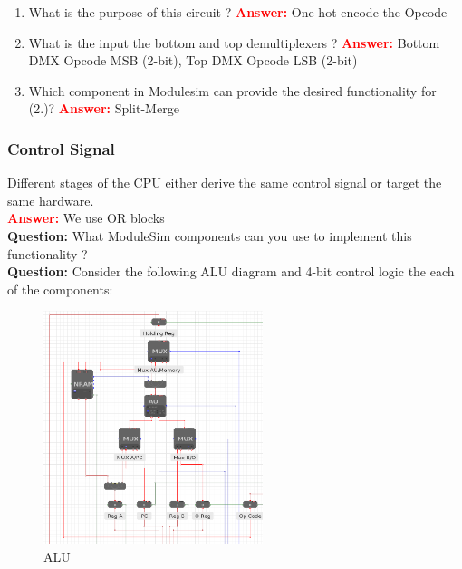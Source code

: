\documentclass[a4paper, 11pt]{article}
\begin{document}
\begin{enumerate}
    \item What is the purpose of this circuit ?
    \textcolor{red}{\textbf{Answer:}} One-hot encode the Opcode\\
    \item What is the input the bottom and top demultiplexers ?
    \textcolor{red}{\textbf{Answer:}} Bottom DMX Opcode MSB (2-bit), Top DMX Opcode LSB (2-bit)\\
    \item Which component in Modulesim can provide the desired functionality for (2.)?
       \textcolor{red}{\textbf{Answer:}} Split-Merge\\
\end{enumerate}
\subsubsection{Control Signal}
Different stages of the CPU either derive the same control signal or target the same hardware. \\
\textcolor{red}{\textbf{Answer:}} We use OR blocks\\
\textbf{Question:} What ModuleSim components can you use to implement this functionality ? \\
\textbf{Question:} Consider the following ALU diagram and 4-bit control logic the each of the components:
\begin{figure}[H]
    \centering
    \includegraphics[width =0.57\textwidth]{Images/Screenshot from 2022-12-14 16-40-47.png}
    \caption{ALU}
    \label{fig:demux}
    \end{figure}
\end{document}
